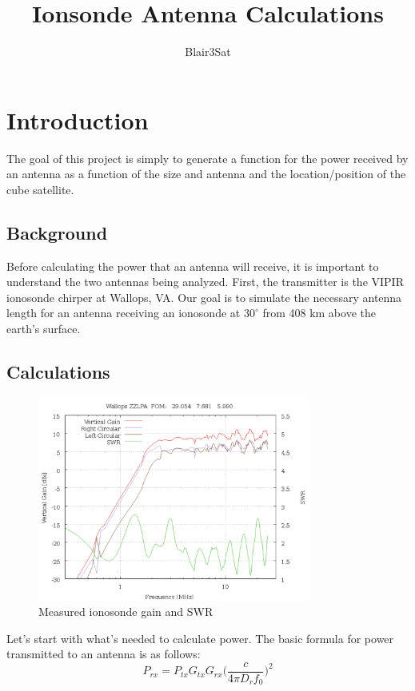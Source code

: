 \documentclass[12pt]{article}
\title{Ionsonde Antenna Calculations \vspace{-2ex}}
\author{Blair3Sat}
\date{}
\begin{document}
\maketitle

\section*{Introduction}
The goal of this project is simply to generate a function for the power received by an antenna as a function of the size and antenna and the location/position of the cube satellite. 
\subsection*{Background}
Before calculating the power that an antenna will receive, it is important to understand the two antennas being analyzed. First, the transmitter is the VIPIR ionosonde chirper at Wallops, VA. Our goal is to simulate the necessary antenna length for an antenna receiving an ionosonde at $30^\circ$ from 408 km above the earth's surface.

\subsection*{Calculations}
\begin{figure}[h]
\centering
\includegraphics[width=0.8\textwidth]{vipir_one}
\caption[Caption for LOF]{Measured ionosonde gain and SWR\protect\footnotemark}
\label{fig:swr}
\end{figure}

Let's start with what's needed to calculate power. The basic formula for power transmitted to an antenna is as follows:
 $$
 P_{rx} = P_{tx}G_{tx}G_{rx} \Bigg( \frac{c}{4\pi D_r f_0} \Bigg)^2
 $$
 
\end{document}

